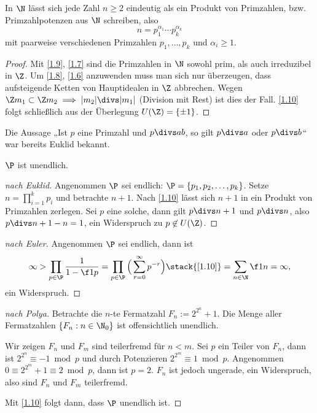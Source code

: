 \begin{st} \label{1.10}
	In $\N$ lässt sich jede Zahl $n \ge 2$ eindeutig als ein Produkt von Primzahlen, bzw. Primzahlpotenzen aus $\N$ schreiben, also
	\[
		n = p_1^{\alpha_1} \dotsb p_k^{\alpha_k}
	\]
	mit paarweise verschiedenen Primzahlen $p_1, \dotsc, p_k$ und $\alpha_i \ge 1$.
	\begin{proof}
		Mit \ref{1.9}, \ref{1.7} sind die Primzahlen in $\N$ sowohl prim, als auch irreduzibel in $\Z$.
		Um \ref{1.8}, \ref{1.6} anzuwenden muss man sich nur überzeugen, dass aufsteigende Ketten von Hauptidealen in $\Z$ abbrechen.
		Wegen $\Z m_1 \subset \Z m_2 \implies |m_2| \divs  |m_1|$ (Division mit Rest) ist dies der Fall.
		\ref{1.10} folgt schließlich aus der Überlegung $U(\Z) = \{ \pm 1 \}$.
	\end{proof}
\end{st}

\begin{nt*}
	Die Aussage „Ist $p$ eine Primzahl und $p \divs  ab$, so gilt $p \divs  a$ oder $p \divs  b$“ war bereits Euklid bekannt.
\end{nt*}

\begin{st}
	$\P$ ist unendlich.
	\begin{proof}[nach Euklid]
		Angenommen $\P$ sei endlich: $\P = \{p_1, p_2, \dotsc, p_k\}$.
		Setze $n = \prod_{i=1}^k p_i$ und betrachte $n + 1$.
		Nach \ref{1.10} lässt sich $n +1$ in ein Produkt von Primzahlen zerlegen.
		Sei $p$ eine solche, dann gilt $p \divs n + 1$ und $p \divs  n$, also $p \divs  n + 1 - n = 1$, ein Widerspruch zu $p \not\in U(\Z)$.
	\end{proof}
	\begin{proof}[nach Euler]
		Angenommen $\P$ sei endlich, dann ist
		\[
			\infty
			> \prod_{p\in \P} \dfrac 1{1 - \f 1p}
			= \prod_{p\in \P} \Big( \sum_{r=0}^\infty p^{-r} \Big)
			\stack{\ref{1.10}}= \sum_{n\in \N} \f 1n
			= \infty,
		\]
		ein Widerspruch.
	\end{proof}
	\begin{proof}[nach Polya]
		Betrachte die $n$-te Fermatzahl $F_n := 2^{2^n} + 1$.
		Die Menge aller Fermatzahlen $\{F_n : n \in \N_0\}$ ist offensichtlich unendlich.

		Wir zeigen $F_n$ und $F_m$ sind teilerfremd für $n < m$.
		Sei $p$ ein Teiler von $F_n$, dann ist $2^{2^n} \equiv -1 \bmod p$ und durch Potenzieren $2^{2^m} \equiv 1 \bmod p$.
		Angenommen $0 \equiv 2^{2^m} + 1 \equiv 2 \bmod p$, dann ist $p = 2$.
		$F_n$ ist jedoch ungerade, ein Widerspruch, also sind $F_n$ und $F_m$ teilerfremd.

		Mit \ref{1.10} folgt dann, dass $\P$ unendlich ist.
	\end{proof}
\end{st}

